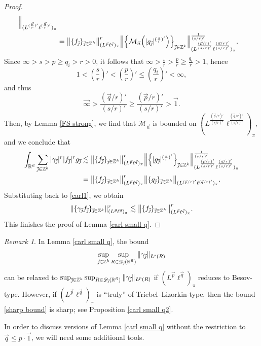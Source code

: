 \documentclass[11pt, reqno]{amsart}
\theoremstyle{definition}
\theoremstyle{remark}
\newtheorem{remark}[theorem]{Remark}
\numberwithin{equation}{section}
\newcommand{\D}{\mathscr D}
\newcommand{\R}{\mathbb R}
\newcommand{\Z}{\mathbb Z}
\newcommand{\vone}{\vec 1}
\newcommand{\vinfty}{\vec{\infty}}
\newcommand{\vj}{\vec{\textit{\j}}}
\newcommand{\vn}{\vec n}
\newcommand{\vp}{\vec p}
\newcommand{\vq}{\vec q}
\newcommand{\aveL}{\textit{\L}}
\newcommand{\abs}[1]{|#1|}
\newcommand{\Norm}[2]{\|#1\|_{#2}}
\newcommand{\bNorm}[2]{\big\|#1\big\|_{#2}}
\begin{document}
\begin{proof}
\begin{align*}
\Big\|_{(L^{(\frac{\vp}r)'}\ell^{(\frac{\vq}r)'})_\pi} \\
&=\bNorm{\{ f_{\vj} \}_{\vj\in\Z^k}}{(L^{\vp}\ell^{\vq})_\pi}^r
\Big\|\Big\{ \mathcal M_{\vn} \Big( \abs{g_{\vj}}^{(\frac sr)'}\Big)  \Big\}_{\vj\in\Z^k}
\Big\|_{(L^{\frac{(\vp/r)'}{(s/r)'}}\ell^{\frac{(\vq/r)'}{(s/r)'}})_\pi}^{\frac 1{(s/r)'}}.
\end{align*}
Since $\infty>s>p\geq q_i>r>0$, it follows that
$\infty>\frac sr>\frac pr\geq \frac{q_i}r>1$, hence
$$1<(\frac sr)'<(\frac pr)'\leq(\frac{q_i}r)'<\infty,$$
and thus $$\vinfty>\frac{(\vq/r)'}{(s/r)'}\geq \frac{(\vp/r)'}{(s/r)'}>\vone.$$
Then, by Lemma \ref{FS strong},
we find that $\mathcal M_{\vn}$ is bounded on $(L^{\frac{(\vp/r)'}{(s/r)'}}\ell^{\frac{(\vq/r)'}{(s/r)'}})_\pi$, and we conclude that
\begin{align*}
\int_{\R^{\vn}}\sum_{\vj\in\Z^k}\abs{\gamma_{\vj}}^r\abs{f_{\vj}}^r g_{\vj}
& \lesssim \bNorm{\{ f_{\vj} \}_{\vj\in\Z^k}}{(L^{\vp}\ell^{\vq})_\pi}^r
\Big\|\Big\{ \abs{g_{\vj}}^{(\frac sr)'} \Big\}_{\vj\in\Z^k}
\Big\|_{( L^{\frac{(\vp/r)'}{(s/r)'}}\ell^{\frac{(\vq/r)'}{(s/r)'}})_\pi}^{\frac 1{(s/r)'}} \\
& = \bNorm{\{ f_{\vj} \}_{\vj\in\Z^k}}{(L^{\vp}\ell^{\vq})_\pi}^r \bNorm{\{ g_{\vj} \}_{\vj\in\Z^k} }{( L^{(\vp/r)'}\ell^{(\vq/r)'})_\pi}.
\end{align*}
Substituting back to \eqref{carl1}, we obtain
\begin{equation*}
\Norm{\{\gamma_{\vj}f_{\vj}\}_{\vj\in\Z^k}}{(L^{\vp}\ell^{\vq})_\pi}^r
\lesssim \bNorm{\{ f_{\vj} \}_{\vj\in\Z^k}}{(L^{\vp}\ell^{\vq})_\pi}^r.
\end{equation*}
This finishes the proof of Lemma \ref{carl small q}.
\end{proof}

\begin{remark}
In Lemma \ref{carl small q},
the bound
\begin{equation}\label{sharp bound}
\sup_{\vj\in\Z^k}\sup_{R\in\D_{\vj}(\R^{\vn})}
\Norm{\gamma_{\vj}}{\aveL^s(R)}
\end{equation}
can be relaxed to
$\sup_{\vj\in\Z^k}\sup_{R\in\D_{\vj}(\R^{\vn})}
\Norm{\gamma_{\vj}}{\aveL^p(R)}$
if $(L^{\vp}\ell^{\vq})_\pi$ reduces to Besov-type.
However, if $(L^{\vp}\ell^{\vq})_\pi$ is ``truly'' of Triebel--Lizorkin-type,
then the bound \eqref{sharp bound} is sharp;
see Proposition \ref{carl small q2}.
\end{remark}

In order to discuss versions of Lemma \ref{carl small q} without the restriction to $\vq\leq p\cdot\vone$, we will need some additional tools.
\end{document}
